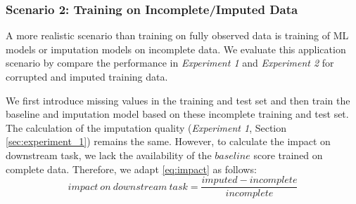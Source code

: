 \subsubsection{Scenario 2: Training on Incomplete/Imputed Data}
\label{sec:scenario_2}
%
A more realistic scenario than training on fully observed data is training of ML models or imputation models on incomplete data. We evaluate this application scenario by compare the performance in \emph{Experiment 1} and \emph{Experiment 2} for corrupted and imputed training data.

We first introduce missing values in the training and test set and then train the baseline and imputation model based on these incomplete training and test set. The calculation of the imputation quality (\emph{Experiment 1}, Section \ref{sec:experiment_1}) remains the same. However, to calculate the impact on downstream task, we lack the availability of the $baseline$ score trained on complete data. Therefore, we adapt \autoref{eq:impact} as follows:
%
\begin{equation}
	impact\ on \ downstream\ task = \frac{imputed - incomplete}{incomplete}
\end{equation}
%
